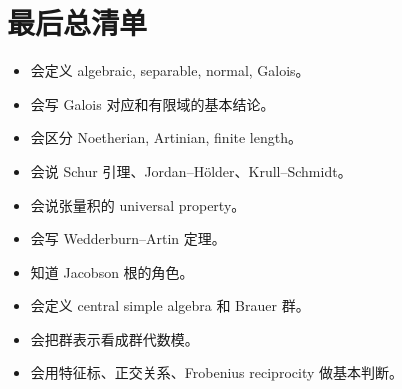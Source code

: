 \documentclass[a4paper]{ctexart}
\begin{document}
\section*{最后总清单}
{}

\begin{itemize}
  \item 会定义 algebraic, separable, normal, Galois。
  \item 会写 Galois 对应和有限域的基本结论。
  \item 会区分 Noetherian, Artinian, finite length。
  \item 会说 Schur 引理、Jordan--H\"older、Krull--Schmidt。
  \item 会说张量积的 universal property。
  \item 会写 Wedderburn--Artin 定理。
  \item 知道 Jacobson 根的角色。
  \item 会定义 central simple algebra 和 Brauer 群。
  \item 会把群表示看成群代数模。
  \item 会用特征标、正交关系、Frobenius reciprocity 做基本判断。
\end{itemize}
\end{document}
